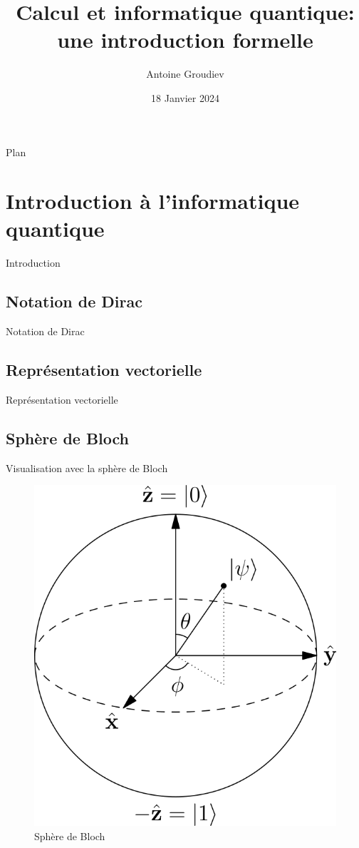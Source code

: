 \documentclass[aspectratio=169]{beamer}
\title{\textbf{Calcul et informatique quantique:\\une introduction formelle}}
\author{Antoine Groudiev}
\institute{ENS Ulm}
\date{18 Janvier 2024}
\theoremstyle{plain}
\theoremstyle{definition}
\begin{document}
\frame{\titlepage}

\begin{frame}{Plan}
    \tableofcontents
\end{frame}

\section{Introduction à l'informatique quantique}
\begin{frame}{Introduction}
\end{frame}

\subsection{Notation de Dirac}
\begin{frame}{Notation de Dirac}
\end{frame}

\subsection{Représentation vectorielle}
\begin{frame}{Représentation vectorielle}
\end{frame}

\subsection{Sphère de Bloch}
\begin{frame}{Visualisation avec la sphère de Bloch}
    \begin{figure}[!h]
        \centering
        \includegraphics{bloch-sphere}
        \caption{Sphère de Bloch}
    \end{figure}
\end{frame}
\end{document}
